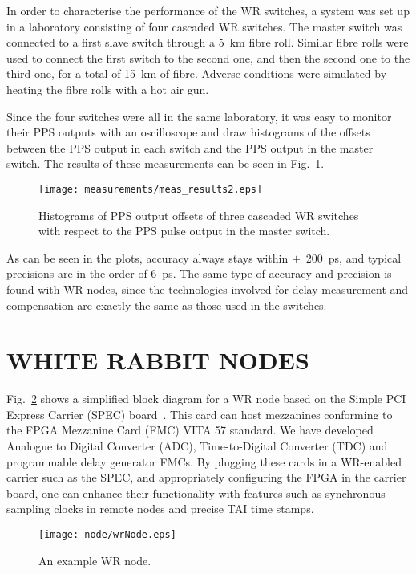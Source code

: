 \documentclass{../JAC2003}
\begin{document}
In order to characterise the performance of the WR switches, a system
was set up in a laboratory consisting of four cascaded WR
switches. The master switch was connected to a first slave switch
through a 5~km fibre roll. Similar fibre rolls were used to connect
the first switch to the second one, and then the second one to the
third one, for a total of 15~km of fibre. Adverse conditions were
simulated by heating the fibre rolls with a hot air gun. 

Since the four switches were all in the same laboratory, it was easy
to monitor their PPS outputs with an oscilloscope and draw histograms
of the offsets between the PPS output in each switch and the PPS
output in the master switch. The results of these measurements can be
seen in Fig.~\ref{performance-fig}.

\begin{figure}[htb]
   \centering
   \texttt{[image: measurements/meas\_results2.eps]}
   \caption{Histograms of PPS output offsets of three cascaded WR
     switches with respect to the PPS pulse output in the master switch.}
   \label{performance-fig}
\end{figure}

As can be seen in the plots, accuracy always stays within
$\pm$~200~ps, and typical precisions are in the order of 6~ps. The
same type of accuracy and precision is found with WR nodes, since the
technologies involved for delay measurement and compensation are
exactly the same as those used in the switches.

\section{WHITE RABBIT NODES}

Fig.~\ref{node-fig} shows a simplified block diagram for a WR node
based on the Simple PCI Express Carrier (SPEC)
board~\cite{spec-ref}. This card can host mezzanines conforming to the
FPGA Mezzanine Card (FMC) VITA 57 standard. We have developed Analogue
to Digital Converter (ADC), Time-to-Digital Converter (TDC) and
programmable delay generator FMCs. By plugging these cards in a
WR-enabled carrier such as the SPEC, and appropriately configuring the
FPGA in the carrier board, one can enhance their functionality with
features such as synchronous sampling clocks in remote nodes and
precise TAI time stamps.

\begin{figure}[htb]
   \centering
   \texttt{[image: node/wrNode.eps]}
   \caption{An example WR node.}
   \label{node-fig}
\end{figure}
\end{document}
